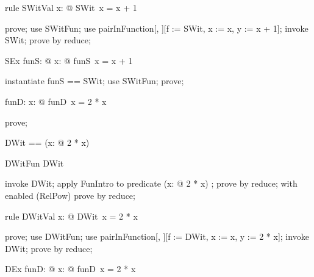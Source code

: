 \documentclass{article}
\begin{document}
\begin{theorem}{rule SWitVal}
  \forall x: \nat @ SWit~x = x + 1
\end{theorem}

\begin{zproof}
prove;
use SWitFun;
use pairInFunction[\nat, \nat][f := SWit, x := x, y := x + 1];
invoke SWit;
prove by reduce;
\end{zproof}

\begin{theorem}{SEx}
  \exists funS: \nat \fun \nat @ \forall x: \nat @ funS~x = x + 1
\end{theorem}

\begin{zproof}
instantiate funS == SWit;
use SWitFun;
prove;
\end{zproof}

\begin{axdef}
  funD: \nat \fun \nat
\where
   \forall x: \nat @ funD~x = 2 * x
\end{axdef}

\begin{zproof}
prove;
\end{zproof}

\begin{zed}
  DWit == (\lambda x: \nat @ 2 * x)
\end{zed}

\begin{theorem}{DWitFun}
  DWit \in \nat \fun \nat
\end{theorem}

\begin{zproof}
invoke DWit;
apply FunIntro to predicate (\lambda x: \nat @ 2 * x) \in \nat \fun \nat;
prove by reduce;
with enabled (RelPow) prove by reduce;
\end{zproof}

\begin{theorem}{rule DWitVal}
  \forall x: \nat @ DWit~x = 2 * x
\end{theorem}

\begin{zproof}
prove;
use DWitFun;
use pairInFunction[\nat, \nat][f := DWit, x := x, y := 2 * x];
invoke DWit;
prove by reduce;
\end{zproof}

\begin{theorem}{DEx}
  \exists funD: \nat \fun \nat @ \forall x: \nat @ funD~x = 2 * x
\end{theorem}
\end{document}
